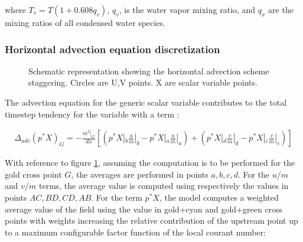where $T_v = T(1 + 0.608q_v)$, $q_v$, is the water vapor mixing ratio, and
$q_x$ are the mixing ratios of all condensed water species.

\subsubsection{Horizontal advection equation discretization}

\begin{figure}
\begin{center}
\caption{Schematic representation showing the horizontal advection
scheme staggering. Circles are U,V points. X are scalar variable points.}
\label{advection_grid}
\end{center}
\end{figure}

The advection equation for the generic scalar variable contributes to the total
timestep tendency for the variable with a term :

\begin{eqnarray}
\label{advection_equation_1}
\Delta_{adv} \left(p^* X\right)_{G} = -\frac{m^2|_G}{dx} \left[ 
  \left( p^*X|_b \frac{u}{m}|_b - p^*X|_a \frac{u}{m}|_a \right) +
  \left( p^*X|_d \frac{v}{m}|_d - p^*X|_c \frac{v}{m}|_c \right)\right]
\end{eqnarray}

With reference to figure \ref{advection_grid}, assuming the computation
is to be performed for the gold cross point $G$, the averages are performed in
points $a,b,c,d$.
For the $u/m$ and $v/m$ terms, the average value is computed using respectively
the values in points $AC,BD,CD,AB$.
For the term $p^*X$, the model computes a weighted average value of the field
using the value in gold+cyan and gold+green cross points with weights
increasing the relative contribution of the upstream point up to a maximum
configurable factor function of the local courant number:

